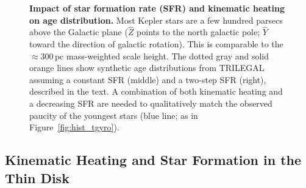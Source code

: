 \documentclass[11pt,twocolumn,tighten]{aastex63}
\begin{document}
\begin{figure}[!t]
	\begin{center}
		\leavevmode
	\end{center}
	\vspace{-0.53cm}
	\caption{{\bf Impact of star formation rate (SFR) and kinematic heating on age distribution.}   
		Most Kepler stars are a few hundred parsecs above the Galactic plane ($\hat{Z}$ points to the north galactic pole;  $\hat{Y}$ toward the direction of
		galactic rotation).  This is comparable to the $\approx$300\,pc mass-weighted scale height.
		The dotted gray and solid orange lines show synthetic age distributions
		from TRILEGAL assuming a constant SFR (middle) and a two-step
		SFR (right), described in the text.
		A combination of both kinematic heating and
		a decreasing SFR are needed to qualitatively match the observed
    paucity of the youngest stars (blue line; as in
    Figure~\ref{fig:hist_tgyro}).
		\label{fig:trilegal}
	}
\end{figure}

\subsection{Kinematic Heating and Star Formation in the Thin Disk}
\label{subsec:trilegal}

\end{document}
